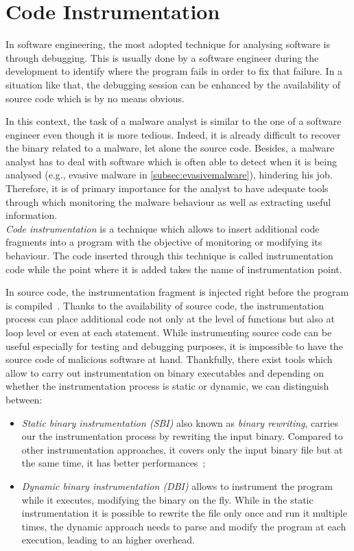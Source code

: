\documentclass[LaM,binding=0.6cm]{sapthesis}
\begin{document}
\section{Code Instrumentation}
In software engineering, the most adopted technique for analysing software is through debugging. This is usually done by a software engineer during the development to identify where the program fails in order to fix that failure. In a situation like that, the debugging session can be enhanced by the availability of source code which is by no means obvious.

In this context, the task of a malware analyst is similar to the one of a software engineer even though it is more tedious. Indeed, it is already difficult to recover the binary related to a malware, let alone the source code. Besides, a malware analyst has to deal with software which is often able to detect when it is being analysed (e.g., evasive malware in \autoref{subsec:evasivemalware}), hindering his job. Therefore, it is of primary importance for the analyst to have adequate tools through which monitoring the malware behaviour as well as extracting useful information.\\ 

\textit{Code instrumentation} is a technique which allows to insert additional code fragments into a program with the objective of monitoring or modifying its behaviour. The code inserted through this technique is called instrumentation code while the point where it is added takes the name of instrumentation point.

In source code, the instrumentation fragment is injected right before the program is compiled~\cite{geimer2009generic}. Thanks to the availability of source code, the instrumentation process can place additional code not only at the level of functions but also at loop level or even at each statement. While instrumenting source code can be useful especially for testing and debugging purposes, it is impossible to have the source code of malicious software at hand. Thankfully, there exist tools which allow to carry out instrumentation on binary executables and depending on whether the instrumentation process is static or dynamic, we can distinguish between:
\begin{itemize}
\item \textit{Static binary instrumentation (SBI)} also known as \textit{binary rewriting}, carries our the instrumentation process by rewriting the input binary. Compared to other instrumentation approaches, it covers only the input binary file but at the same time, it has better performances~\cite{ermakov2017static};
\item \textit{Dynamic binary instrumentation (DBI)} allows to instrument the program while it executes, modifying the binary on the fly. While in the static instrumentation it is possible to rewrite the file only once and run it multiple times, the dynamic approach needs to parse and modify the program at each execution, leading to an higher overhead.
\end{itemize}
\end{document}
